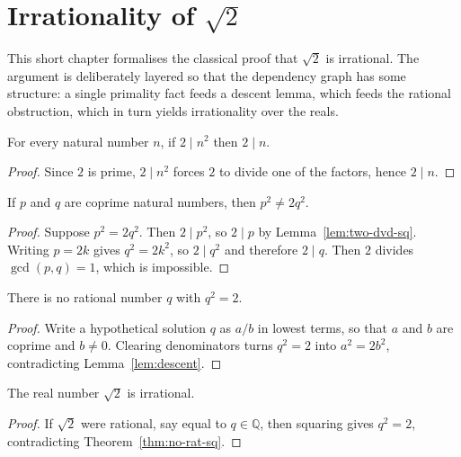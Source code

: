 \chapter{Irrationality of \texorpdfstring{$\sqrt{2}$}{the square root of 2}}

This short chapter formalises the classical proof that $\sqrt{2}$ is
irrational. The argument is deliberately layered so that the dependency graph
has some structure: a single primality fact feeds a descent lemma, which feeds
the rational obstruction, which in turn yields irrationality over the reals.

\begin{lemma}
  \label{lem:two-dvd-sq}
  \leanok
  For every natural number $n$, if $2 \mid n^2$ then $2 \mid n$.
\end{lemma}

\begin{proof}
  \leanok
  Since $2$ is prime, $2 \mid n^2$ forces $2$ to divide one of the factors,
  hence $2 \mid n$.
\end{proof}

\begin{lemma}[No coprime solution to $p^2 = 2q^2$]
  \label{lem:descent}
  \leanok
  If $p$ and $q$ are coprime natural numbers, then $p^2 \neq 2 q^2$.
\end{lemma}

\begin{proof}
  \leanok
  Suppose $p^2 = 2 q^2$. Then $2 \mid p^2$, so $2 \mid p$ by
  Lemma~\ref{lem:two-dvd-sq}. Writing $p = 2k$ gives $q^2 = 2 k^2$, so $2 \mid
  q^2$ and therefore $2 \mid q$. Then $2$ divides $\gcd(p, q) = 1$, which is
  impossible.
\end{proof}

\begin{theorem}
  \label{thm:no-rat-sq}
  \leanok
  There is no rational number $q$ with $q^2 = 2$.
\end{theorem}

\begin{proof}
  \leanok
  Write a hypothetical solution $q$ as $a / b$ in lowest terms, so that $a$ and
  $b$ are coprime and $b \neq 0$. Clearing denominators turns $q^2 = 2$ into
  $a^2 = 2 b^2$, contradicting Lemma~\ref{lem:descent}.
\end{proof}

\begin{theorem}
  \label{thm:irrational-sqrt-two}
  \leanok
  The real number $\sqrt{2}$ is irrational.
\end{theorem}

\begin{proof}
  \leanok
  If $\sqrt{2}$ were rational, say equal to $q \in \mathbb{Q}$, then squaring
  gives $q^2 = 2$, contradicting Theorem~\ref{thm:no-rat-sq}.
\end{proof}
